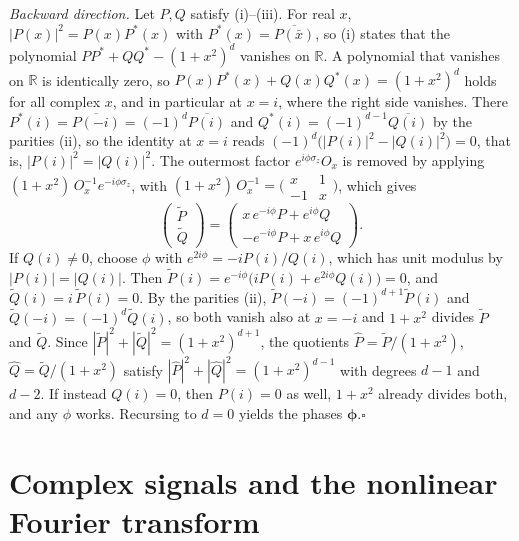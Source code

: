 \documentclass[
    reprint,
    amsmath,amssymb,
    aps,
    pra,
    superscriptaddress,
    floatfix
]{revtex4-2}
\theoremstyle{aps}
\newcommand{\R}{\mathbb{R}}
\newcommand{\PauliZ}{\sigma_z}
\begin{document}
\emph{Backward direction.}  Let $P,Q$ satisfy (i)--(iii).  For
real $x$, $|P(x)|^2=P(x)P^*(x)$ with $P^*(x)=\overline{P(\bar x)}$,
so (i) states that the polynomial $PP^*+QQ^*-(1+x^2)^d$ vanishes on
$\R$.  A polynomial that vanishes on $\R$ is identically zero, so
$P(x)P^*(x)+Q(x)Q^*(x)=(1+x^2)^d$ holds for all complex $x$, and in
particular at $x=i$, where the right side vanishes.  There
$P^*(i)=\overline{P(-i)}=(-1)^d\overline{P(i)}$ and
$Q^*(i)=(-1)^{d-1}\overline{Q(i)}$ by the parities (ii), so the
identity at $x=i$ reads $(-1)^d\bigl(|P(i)|^2-|Q(i)|^2\bigr)=0$,
that is, $|P(i)|^2=|Q(i)|^2$.  The outermost factor
$e^{i\phi\PauliZ}O_x$ is removed by applying
$(1+x^2)\,O_x^{-1}e^{-i\phi\PauliZ}$, with
$(1+x^2)\,O_x^{-1}=\bigl(\begin{smallmatrix}x&1\\-1&x
\end{smallmatrix}\bigr)$, which gives
\begin{equation}
	\begin{pmatrix}\widetilde P\\ \widetilde Q\end{pmatrix}
	=\begin{pmatrix} x\,e^{-i\phi}P+e^{i\phi}Q\\
		-e^{-i\phi}P+x\,e^{i\phi}Q\end{pmatrix}.
\end{equation}
If $Q(i)\neq 0$, choose $\phi$ with $e^{2i\phi}=-iP(i)/Q(i)$, which
has unit modulus by $|P(i)|=|Q(i)|$.  Then
$\widetilde P(i)=e^{-i\phi}\bigl(iP(i)+e^{2i\phi}Q(i)\bigr)=0$, and
$\widetilde Q(i)=i\,\widetilde P(i)=0$.  By the parities (ii),
$\widetilde P(-i)=(-1)^{d+1}\widetilde P(i)$ and
$\widetilde Q(-i)=(-1)^{d}\widetilde Q(i)$, so both vanish also at
$x=-i$ and $1+x^2$ divides $\widetilde P$ and $\widetilde Q$.  Since
$|\widetilde P|^2+|\widetilde Q|^2=(1+x^2)^{d+1}$, the
quotients $\widehat
P=\widetilde P/(1+x^2)$, $\widehat Q=\widetilde Q/(1+x^2)$ satisfy
$|\widehat P|^2+|\widehat Q|^2=(1+x^2)^{d-1}$ with degrees $d-1$ and
$d-2$.  If instead $Q(i)=0$, then $P(i)=0$ as well, $1+x^2$
already divides both, and any $\phi$ works.  Recursing to $d=0$
yields the phases $\bm\phi$.\hfill$\square$

\section{Complex signals and the nonlinear Fourier transform}
\label{app:thm-gen}
\end{document}
